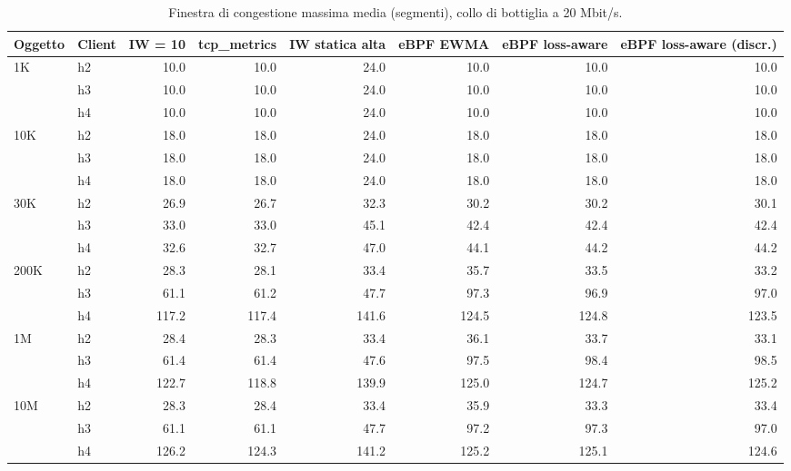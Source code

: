 \begin{table}[htbp]
  \centering
  \caption{Finestra di congestione massima media (segmenti), collo di bottiglia a 20 Mbit/s.}
  \label{tab:cwnd-20}
  \begin{tabular}{llrrrrrr}
    \toprule
    Oggetto & Client & IW = 10 & tcp\_metrics & IW statica alta & eBPF EWMA & eBPF loss-aware & eBPF loss-aware (discr.) \\
    \midrule
    1K & h2 & 10.0 & 10.0 & 24.0 & 10.0 & 10.0 & 10.0 \\
     & h3 & 10.0 & 10.0 & 24.0 & 10.0 & 10.0 & 10.0 \\
     & h4 & 10.0 & 10.0 & 24.0 & 10.0 & 10.0 & 10.0 \\
    \addlinespace
    10K & h2 & 18.0 & 18.0 & 24.0 & 18.0 & 18.0 & 18.0 \\
     & h3 & 18.0 & 18.0 & 24.0 & 18.0 & 18.0 & 18.0 \\
     & h4 & 18.0 & 18.0 & 24.0 & 18.0 & 18.0 & 18.0 \\
    \addlinespace
    30K & h2 & 26.9 & 26.7 & 32.3 & 30.2 & 30.2 & 30.1 \\
     & h3 & 33.0 & 33.0 & 45.1 & 42.4 & 42.4 & 42.4 \\
     & h4 & 32.6 & 32.7 & 47.0 & 44.1 & 44.2 & 44.2 \\
    \addlinespace
    200K & h2 & 28.3 & 28.1 & 33.4 & 35.7 & 33.5 & 33.2 \\
     & h3 & 61.1 & 61.2 & 47.7 & 97.3 & 96.9 & 97.0 \\
     & h4 & 117.2 & 117.4 & 141.6 & 124.5 & 124.8 & 123.5 \\
    \addlinespace
    1M & h2 & 28.4 & 28.3 & 33.4 & 36.1 & 33.7 & 33.1 \\
     & h3 & 61.4 & 61.4 & 47.6 & 97.5 & 98.4 & 98.5 \\
     & h4 & 122.7 & 118.8 & 139.9 & 125.0 & 124.7 & 125.2 \\
    \addlinespace
    10M & h2 & 28.3 & 28.4 & 33.4 & 35.9 & 33.3 & 33.4 \\
     & h3 & 61.1 & 61.1 & 47.7 & 97.2 & 97.3 & 97.0 \\
     & h4 & 126.2 & 124.3 & 141.2 & 125.2 & 125.1 & 124.6 \\
    \bottomrule
  \end{tabular}
\end{table}
